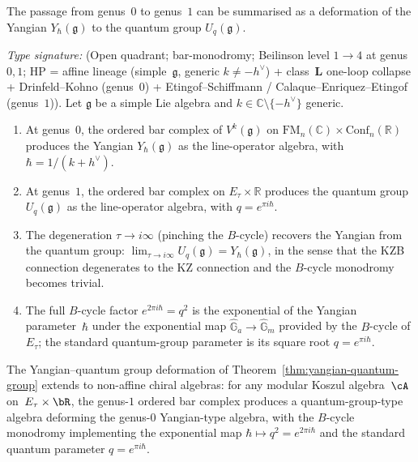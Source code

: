 The passage from genus~$0$ to genus~$1$ can be summarised as a
deformation of the Yangian $Y_\hbar(\mathfrak{g})$ to the
quantum group $U_q(\mathfrak{g})$.

\begin{theorem}
\ClaimStatusProvedHere
\label{thm:yangian-quantum-group}
\emph{Type signature:} (Open quadrant; bar-monodromy; Beilinson
level $1\!\rightarrow\!4$ at genus~$0,1$; HP = affine lineage
\textup{(}simple~$\mathfrak{g}$, generic $k\neq -h^\vee$\textup{)}
+ class~$\mathbf L$ one-loop collapse + Drinfeld--Kohno
\textup{(}genus~$0$\textup{)} + Etingof--Schiffmann /
Calaque--Enriquez--Etingof \textup{(}genus~$1$\textup{)}).
Let $\mathfrak{g}$ be a simple Lie algebra and $k \in \mathbb{C}
\setminus \{-h^\vee\}$ generic.
\begin{enumerate}[label=\textup{(\roman*)}]
\item At genus~$0$, the ordered bar complex of $V^k(\mathfrak{g})$ on
 $\mathrm{FM}_n(\mathbb{C}) \times \mathrm{Conf}_n(\mathbb{R})$
 produces the Yangian $Y_\hbar(\mathfrak{g})$ as the line-operator
 algebra, with $\hbar = 1/(k + h^\vee)$.

\item At genus~$1$, the ordered bar complex on
 $E_\tau \times \mathbb{R}$ produces the quantum group
 $U_q(\mathfrak{g})$ as the line-operator algebra, with
 $q = e^{\pi i \hbar}$.

\item The degeneration $\tau \to i\infty$ \textup{(}pinching the
 $B$-cycle\textup{)} recovers the Yangian from the quantum group:
 $\lim_{\tau \to i\infty} U_q(\mathfrak{g})
 = Y_\hbar(\mathfrak{g})$, in the sense that the KZB connection
 degenerates to the KZ connection and the $B$-cycle monodromy becomes
 trivial.

\item The full $B$-cycle factor $e^{2\pi i \hbar} = q^2$ is the
 exponential of the Yangian parameter~$\hbar$ under the exponential map
 $\widehat{\mathbb{G}}_a \to \widehat{\mathbb{G}}_m$ provided by the
 $B$-cycle of $E_\tau$; the standard quantum-group parameter is its
 square root $q = e^{\pi i \hbar}$.
\end{enumerate}
\end{theorem}

\begin{conjecture}
\ClaimStatusConjectured
\label{conj:yangian-quantum-group-general}
The Yangian--quantum group deformation of
Theorem~\textup{\ref{thm:yangian-quantum-group}} extends to
non-affine chiral algebras: for any modular Koszul algebra~$\cA$
on~$E_\tau \times \bR$, the genus-$1$ ordered bar complex produces
a quantum-group-type algebra deforming the genus-$0$ Yangian-type
algebra, with the $B$-cycle monodromy implementing the exponential
map $\hbar \mapsto q^2 = e^{2\pi i \hbar}$ and the standard quantum
parameter $q = e^{\pi i \hbar}$.
\end{conjecture}

